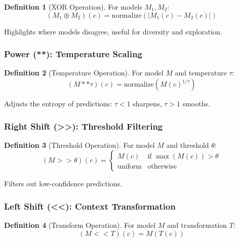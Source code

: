 \documentclass{article}
\theoremstyle{definition}
\newtheorem{definition}{Definition}
\begin{document}
\begin{definition}[XOR Operation]
For models $M_1, M_2$:
\begin{equation}
(M_1 \oplus M_2)(c) = \text{normalize}(|M_1(c) - M_2(c)|)
\end{equation}
\end{definition}

Highlights where models disagree, useful for diversity and exploration.

\subsubsection{Power (**): Temperature Scaling}

\begin{definition}[Temperature Operation]
For model $M$ and temperature $\tau$:
\begin{equation}
(M ** \tau)(c) = \text{normalize}(M(c)^{1/\tau})
\end{equation}
\end{definition}

Adjusts the entropy of predictions: $\tau < 1$ sharpens, $\tau > 1$ smooths.

\subsubsection{Right Shift (>>): Threshold Filtering}

\begin{definition}[Threshold Operation]
For model $M$ and threshold $\theta$:
\begin{equation}
(M >> \theta)(c) = \begin{cases}
M(c) & \text{if } \max(M(c)) > \theta \\
\text{uniform} & \text{otherwise}
\end{cases}
\end{equation}
\end{definition}

Filters out low-confidence predictions.

\subsubsection{Left Shift (<<): Context Transformation}

\begin{definition}[Transform Operation]
For model $M$ and transformation $T$:
\begin{equation}
(M << T)(c) = M(T(c))
\end{equation}
\end{definition}
\end{document}
